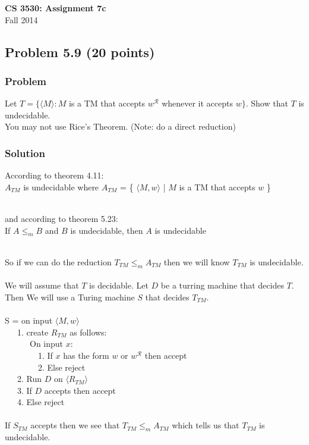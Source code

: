 \documentclass{article}
\begin{document}
\begin{center}
\textbf{\Large CS 3530: Assignment 7c} \\[2mm]
Fall 2014
\end{center}

\raggedright

\subsection*{Problem 5.9 (20 points)}

\subsubsection*{Problem}

Let $T=\{\langle M\rangle: M$ is a TM that accepts $w^\mathcal{R}$
whenever it accepts $w\}$. Show that $T$ is undecidable. \\
You may not use Rice's Theorem. (Note: do a direct reduction)

\subsubsection*{Solution}

According to theorem 4.11: \\

$A_{TM}$ is undecidable where
\centering
$A_{TM}$ = \{ $\langle M, w\rangle$ | $M$ is a TM that accepts $w$ \} \\ \ \\
\raggedright


and according to theorem 5.23: \\
\centering
If $A\leq_m B$ and $B$ is undecidable, then $A$ is undecidable \\ \ \\
\raggedright

So if we can do the reduction $T_{TM} \leq_{m} A_{TM}$ then we will know
$T_{TM}$ is undecidable.\\ \ \\


We will assume that $T$ is decidable.
Let $D$ be a turring machine that decides $T$. \\
Then We will use a Turing machine $S$ that decides $T_{TM}$. \\ \ \\

S = on input $\langle M, w\rangle$ \\
\ \ \ 1. create $R_{TM}$ as follows: \\
\ \ \ \ \ \ On input $x$: \\
\ \ \ \	\ \ \ \ 1. If $x$ has the form $w$ or $w^\mathcal{R}$ then accept \\
\ \ \ \	\ \ \ \ 2. Else reject \\
\ \ \ 2. Run $D$ on $\langle R_{TM}\rangle$ \\
\ \ \ 3. If $D$ accepts then accept \\
\ \ \ 4. Else reject \\ \ \\

If $S_{TM}$ accepts then we see that $T_{TM} \leq_{m} A_{TM}$ which tells us that
$T_{TM}$ is undecidable.
\end{document}
